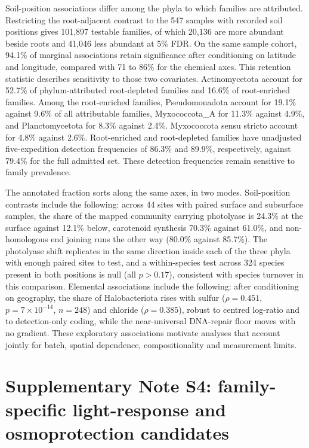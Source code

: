 \documentclass[11pt]{article}
\begin{document}
Soil-position associations differ among the phyla to which families are attributed. Restricting
the root-adjacent contrast to the 547 samples with recorded soil positions gives 101{,}897 testable
families, of which 20{,}136 are more abundant beside roots and 41{,}046 less abundant at 5\% FDR.
On the same sample cohort, 94.1\% of marginal associations retain significance after conditioning
on latitude and longitude, compared with 71 to 86\% for the chemical axes. This retention statistic
describes sensitivity to those two covariates. Actinomycetota account for 52.7\% of phylum-attributed
root-depleted families and 16.6\% of root-enriched families. Among the root-enriched families,
Pseudomonadota account for 19.1\% against 9.6\% of all attributable families, Myxococcota\_A for
11.3\% against 4.9\%, and Planctomycetota for 8.3\% against 2.4\%. Myxococcota sensu stricto
account for 4.8\% against 2.6\%. Root-enriched and root-depleted families have unadjusted
five-expedition detection frequencies of 86.3\% and 89.9\%, respectively, against 79.4\% for the
full admitted set. These detection frequencies remain sensitive to family prevalence.

The annotated fraction sorts along the same axes, in two modes. Soil-position contrasts include the following:
across 44 sites with paired surface and subsurface samples, the share of the mapped community
carrying photolyase is 24.3\% at the surface against 12.1\% below, carotenoid synthesis 70.3\%
against 61.0\%, and non-homologous end joining runs the other way (80.0\% against 85.7\%). The photolyase shift replicates in the same direction inside each of
the three phyla with enough paired sites to test, and a within-species test across 324 species
present in both positions is null (all $p > 0.17$), consistent with species turnover in this comparison. Elemental associations include the following: after conditioning on geography,
the share of Halobacteriota rises with sulfur ($\rho = 0.451$, $p = 7 \times 10^{-14}$, $n = 248$)
and chloride ($\rho = 0.385$), robust to centred log-ratio and to detection-only coding, while the
near-universal DNA-repair floor moves with no gradient. These exploratory associations motivate analyses that account jointly for batch, spatial dependence, compositionality and measurement limits.


\section*{Supplementary Note S4: family-specific light-response and osmoprotection candidates}
\end{document}

